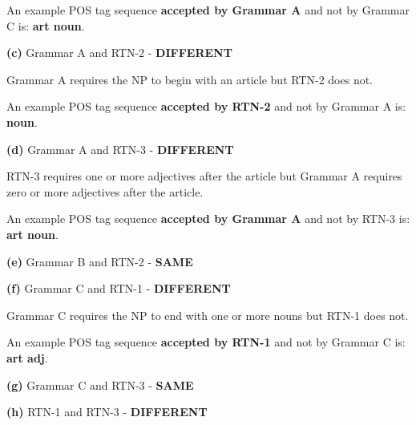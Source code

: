 \documentclass[11pt]{article}
\renewcommand\part[1]{\vspace{.10in}\textbf{(#1)}}
\begin{document}
An example POS tag sequence \textbf{accepted by Grammar A} and not by Grammar C is: \textbf{art noun}. \newline

\part{c} Grammar A and RTN-2 - \textbf{DIFFERENT}

Grammar A requires the NP to begin with an article but RTN-2 does not.

An example POS tag sequence \textbf{accepted by RTN-2} and not by Grammar A is: \textbf{noun}.\newline

\part{d} Grammar A and RTN-3 - \textbf{DIFFERENT}

RTN-3 requires one or more adjectives after the article but Grammar A requires zero or more adjectives after the article.

An example POS tag sequence \textbf{accepted by Grammar A} and not by RTN-3 is: \textbf{art noun}.\newline

\part{e} Grammar B and RTN-2 - \textbf{SAME}\newline

\part{f} Grammar C and RTN-1 - \textbf{DIFFERENT}

Grammar C requires the NP to end with one or more nouns but RTN-1 does not.

An example POS tag sequence \textbf{accepted by RTN-1} and not by Grammar C is: \textbf{art adj}.\newline

\part{g} Grammar C and RTN-3 - \textbf{SAME}\newline

\part{h} RTN-1 and RTN-3 - \textbf{DIFFERENT}
\end{document}
